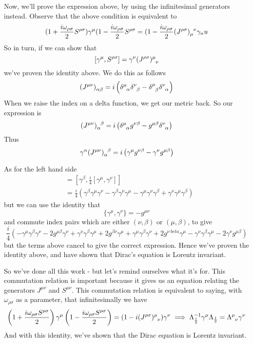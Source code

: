 Now, we'll prove the expression above, by using the infinitesimal generators instead. Observe that the above condition is equivalent to \[ 
( 1 + \frac{ i \omega_{ \rho \sigma} }{ 2} S^{ \rho \sigma} ) \gamma^\mu (1 - \frac{ i \omega_{ \rho \sigma }}{ 2} S^{ \rho \sigma} = ( 1 - \frac{ i \omega_{ \rho \sigma}}{ 2} ( J^{ \rho \sigma} )\indices{ _\mu^\nu}\gamma_nu \] So in turn, if we can show that \[ [\gamma^\mu, S^{\rho \sigma}] = \gamma^\nu (J^{\rho \sigma})\indices{^\mu_\nu} \] we've proven the identity above. We do this as follows 
\[ (J^{\mu \nu} )\indices{_\alpha_\beta}  = i \left( \delta\indices{^\mu_\alpha} \delta\indices{^\nu_\beta} - \delta\indices{^\mu_\beta}\delta\indices{^\nu_\alpha} \right)\]  
When we raise the index on a delta function, we get our metric back. So our expression is 
\[ (J^{\mu\nu})\indices{_\alpha^\beta} = i \left( \delta\indices{^\mu_\alpha} g^{\nu\beta} - g^{\mu\beta}\delta\indices{^\nu_\alpha} \right) \]
Thus \[ \gamma^\alpha (J^{\mu\nu} )\indices{_\alpha^\beta} = i \left( \gamma^\mu g^{\nu\beta} - \gamma^\nu g^{\mu\beta} \right) \]


As for the left hand side \begin{align*} [\gamma^\beta, S^{\mu\nu}] &= [\gamma^\beta, \frac{i}{4} [\gamma^\mu, \gamma^\nu]] \\ &= \frac{i}{4}\left( \gamma^\beta \gamma^\mu \gamma^\nu - \gamma^\beta \gamma^\nu \gamma^\mu - \gamma^\mu \gamma^\nu \gamma^\beta + \gamma^\nu \gamma^\mu \gamma^\beta \right) \end{align*} but we can use the identity that \[ \{ \gamma^\mu , \gamma^\nu \} = - g^{\mu\nu} \] and commute index pairs which are either $( \nu, \beta) $ or $ ( \mu, \beta ) $, to give 
\[ \frac{i} { 4} \left( - \gamma^\mu \gamma^\beta \gamma^\nu - 2g^{\mu \beta } \gamma^\nu  + \gamma^\nu \gamma^\beta \gamma^\mu + 2 g^{\beta \nu} \gamma^\mu + \gamma^\mu \gamma^\beta\gamma^\nu + 2 g^{ \nu \ beta } \gamma^\mu - \gamma^\nu \gamma^\beta \gamma^\mu - 2 \gamma^\nu g^{\mu \beta} \right) \] 
but the terms above cancel to give the correct expression. Hence we've proven the identity above, and have shown that Dirac's equation is Lorentz invariant.  

So we've done all this work - but let's remind ourselves what it's for. This commutation relation is important because it gives us an equation relating the generators $J^{\mu\nu}$ and $S^{ \mu \nu } $. This commutation relation is equivalent to saying, with $\omega_{\rho \sigma} $ as a parameter, that infinitesimally we have \[ \left(  1 + \frac{ i \omega_{ \rho \sigma } S^{ \rho \sigma} }{ 2} \right) \gamma^\mu \left( 1 - \frac{ i \omega_{ \rho\sigma} S^{ \rho \sigma }}{2} \right)  = ( 1 - i ( J^{ \rho \sigma } )\indices{^\mu_\nu})  \gamma^\nu \implies \Lambda_{ \frac{1}{2}}^{ -1} \gamma^\mu \Lambda_{ \frac{1}{2}}  = \Lambda\indices{^\mu_\nu}\gamma^\nu \]  
And with this identity, we've shown that the Dirac equation is Lorentz invariant. 

